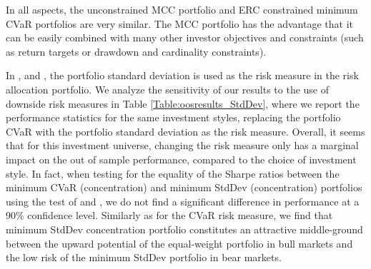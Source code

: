 \documentclass[12pt,a4paper]{article}
\begin{document}
In all aspects, the unconstrained MCC portfolio and ERC constrained minimum CVaR portfolios are very similar. The MCC portfolio has the 
advantage that it can be easily combined with many other investor objectives and constraints (such as return targets or drawdown and cardinality constraints).


In \citet{Maillard2010}, \citet{Qian2005} and \citet{Zhu2010}, the portfolio standard deviation is used as the risk measure in the risk allocation portfolio. We analyze the sensitivity of our results to the use of downside risk measures in Table \ref{Table:oosresults_StdDev}, where we report the performance statistics for the same investment styles, replacing the portfolio CVaR with the portfolio standard deviation as the risk measure. Overall, it seems that for this investment universe,  changing the risk measure only has a marginal impact on the out of sample performance, compared to the choice of investment style. In fact, when testing for the equality of the Sharpe ratios between the minimum CVaR (concentration) and minimum StdDev (concentration) portfolios using the test of \citet{JobsonKorkie1981} and \citet{Memmel2003}, we do not find a significant difference in performance at a 90\% confidence level.  Similarly as for the CVaR risk measure, we find that minimum StdDev concentration portfolio constitutes an attractive middle-ground between the upward potential of the equal-weight portfolio in bull markets and the low risk of the minimum StdDev portfolio in bear markets.
\end{document}
